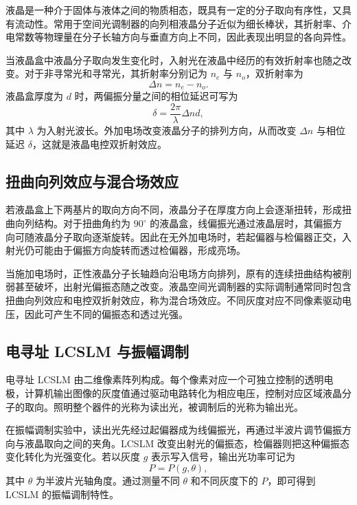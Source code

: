 \documentclass[a4paper]{ctexart}
\begin{document}
液晶是一种介于固体与液体之间的物质相态，既具有一定的分子取向有序性，又具有流动性。常用于空间光调制器的向列相液晶分子近似为细长棒状，其折射率、介电常数等物理量在分子长轴方向与垂直方向上不同，因此表现出明显的各向异性。

当液晶盒中液晶分子取向发生变化时，入射光在液晶中经历的有效折射率也随之改变。对于非寻常光和寻常光，其折射率分别记为 $n_e$ 与 $n_o$，双折射率为
\begin{equation}
    \Delta n=n_e-n_o .
\end{equation}
液晶盒厚度为 $d$ 时，两偏振分量之间的相位延迟可写为
\begin{equation}
    \delta=\frac{2\pi}{\lambda}\Delta n d ,
\end{equation}
其中 $\lambda$ 为入射光波长。外加电场改变液晶分子的排列方向，从而改变 $\Delta n$ 与相位延迟 $\delta$，这就是液晶电控双折射效应。

\subsection{扭曲向列效应与混合场效应}

若液晶盒上下两基片的取向方向不同，液晶分子在厚度方向上会逐渐扭转，形成扭曲向列结构。对于扭曲角约为 $90^\circ$ 的液晶盒，线偏振光通过液晶层时，其偏振方向可随液晶分子取向逐渐旋转。因此在无外加电场时，若起偏器与检偏器正交，入射光仍可能由于偏振方向旋转而透过检偏器，形成亮场。

当施加电场时，正性液晶分子长轴趋向沿电场方向排列，原有的连续扭曲结构被削弱甚至破坏，出射光偏振态随之改变。液晶空间光调制器的实际调制通常同时包含扭曲向列效应和电控双折射效应，称为混合场效应。不同灰度对应不同像素驱动电压，因此可产生不同的偏振态和透过光强。

\subsection{电寻址 LCSLM 与振幅调制}

电寻址 LCSLM 由二维像素阵列构成。每个像素对应一个可独立控制的透明电极，计算机输出图像的灰度值通过驱动电路转化为相应电压，控制对应区域液晶分子的取向。照明整个器件的光称为读出光，被调制后的光称为输出光。

在振幅调制实验中，读出光先经过起偏器成为线偏振光，再通过半波片调节偏振方向与液晶取向之间的夹角。LCSLM 改变出射光的偏振态，检偏器则把这种偏振态变化转化为光强变化。若以灰度 $g$ 表示写入信号，输出光功率可记为
\begin{equation}
    P=P(g,\theta),
\end{equation}
其中 $\theta$ 为半波片光轴角度。通过测量不同 $\theta$ 和不同灰度下的 $P$，即可得到 LCSLM 的振幅调制特性。
\end{document}
